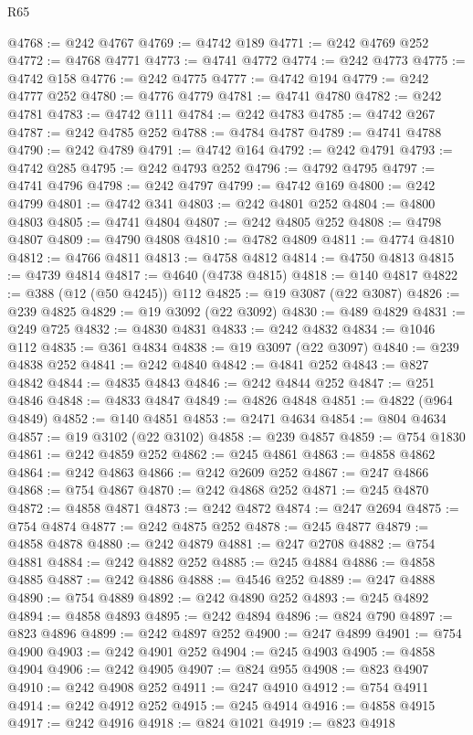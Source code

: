 \begin{lexlean}{R65}
\begin{coremodule}
{@4768 := @242 @4767
@4769 := @4742 @189
@4771 := @242 @4769 @252
@4772 := @4768 @4771
@4773 := @4741 @4772
@4774 := @242 @4773
@4775 := @4742 @158
@4776 := @242 @4775
@4777 := @4742 @194
@4779 := @242 @4777 @252
@4780 := @4776 @4779
@4781 := @4741 @4780
@4782 := @242 @4781
@4783 := @4742 @111
@4784 := @242 @4783
@4785 := @4742 @267
@4787 := @242 @4785 @252
@4788 := @4784 @4787
@4789 := @4741 @4788
@4790 := @242 @4789
@4791 := @4742 @164
@4792 := @242 @4791
@4793 := @4742 @285
@4795 := @242 @4793 @252
@4796 := @4792 @4795
@4797 := @4741 @4796
@4798 := @242 @4797
@4799 := @4742 @169
@4800 := @242 @4799
@4801 := @4742 @341
@4803 := @242 @4801 @252
@4804 := @4800 @4803
@4805 := @4741 @4804
@4807 := @242 @4805 @252
@4808 := @4798 @4807
@4809 := @4790 @4808
@4810 := @4782 @4809
@4811 := @4774 @4810
@4812 := @4766 @4811
@4813 := @4758 @4812
@4814 := @4750 @4813
@4815 := @4739 @4814
@4817 := @4640 (@4738 @4815)
@4818 := @140 @4817
@4822 := @388 (@12 (@50 @4245)) @112
@4825 := @19 @3087 (@22 @3087)
@4826 := @239 @4825
@4829 := @19 @3092 (@22 @3092)
@4830 := @489 @4829
@4831 := @249 @725
@4832 := @4830 @4831
@4833 := @242 @4832
@4834 := @1046 @112
@4835 := @361 @4834
@4838 := @19 @3097 (@22 @3097)
@4840 := @239 @4838 @252
@4841 := @242 @4840
@4842 := @4841 @252
@4843 := @827 @4842
@4844 := @4835 @4843
@4846 := @242 @4844 @252
@4847 := @251 @4846
@4848 := @4833 @4847
@4849 := @4826 @4848
@4851 := @4822 (@964 @4849)
@4852 := @140 @4851
@4853 := @2471 @4634
@4854 := @804 @4634
@4857 := @19 @3102 (@22 @3102)
@4858 := @239 @4857
@4859 := @754 @1830
@4861 := @242 @4859 @252
@4862 := @245 @4861
@4863 := @4858 @4862
@4864 := @242 @4863
@4866 := @242 @2609 @252
@4867 := @247 @4866
@4868 := @754 @4867
@4870 := @242 @4868 @252
@4871 := @245 @4870
@4872 := @4858 @4871
@4873 := @242 @4872
@4874 := @247 @2694
@4875 := @754 @4874
@4877 := @242 @4875 @252
@4878 := @245 @4877
@4879 := @4858 @4878
@4880 := @242 @4879
@4881 := @247 @2708
@4882 := @754 @4881
@4884 := @242 @4882 @252
@4885 := @245 @4884
@4886 := @4858 @4885
@4887 := @242 @4886
@4888 := @4546 @252
@4889 := @247 @4888
@4890 := @754 @4889
@4892 := @242 @4890 @252
@4893 := @245 @4892
@4894 := @4858 @4893
@4895 := @242 @4894
@4896 := @824 @790
@4897 := @823 @4896
@4899 := @242 @4897 @252
@4900 := @247 @4899
@4901 := @754 @4900
@4903 := @242 @4901 @252
@4904 := @245 @4903
@4905 := @4858 @4904
@4906 := @242 @4905
@4907 := @824 @955
@4908 := @823 @4907
@4910 := @242 @4908 @252
@4911 := @247 @4910
@4912 := @754 @4911
@4914 := @242 @4912 @252
@4915 := @245 @4914
@4916 := @4858 @4915
@4917 := @242 @4916
@4918 := @824 @1021
@4919 := @823 @4918
}
\end{coremodule}
\end{lexlean}
